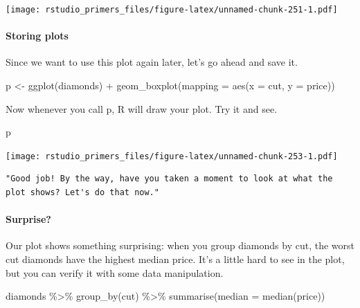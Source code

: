 \documentclass[
]{article}
\newenvironment{Shaded}{\begin{snugshade}}{\end{snugshade}}
\newcommand{\AttributeTok}[1]{\textcolor[rgb]{0.77,0.63,0.00}{#1}}
\newcommand{\FunctionTok}[1]{\textcolor[rgb]{0.00,0.00,0.00}{#1}}
\newcommand{\NormalTok}[1]{#1}
\newcommand{\OtherTok}[1]{\textcolor[rgb]{0.56,0.35,0.01}{#1}}
\newcommand{\SpecialCharTok}[1]{\textcolor[rgb]{0.00,0.00,0.00}{#1}}
\begin{document}
\texttt{[image: rstudio\_primers\_files/figure-latex/unnamed-chunk-251-1.pdf]}

\hypertarget{storing-plots}{%
\paragraph{Storing plots}\label{storing-plots}}

Since we want to use this plot again later, let's go ahead and save it.

\begin{Shaded}
\begin{Highlighting}[]
\NormalTok{p }\OtherTok{\textless{}{-}} \FunctionTok{ggplot}\NormalTok{(diamonds) }\SpecialCharTok{+}
  \FunctionTok{geom\_boxplot}\NormalTok{(}\AttributeTok{mapping =} \FunctionTok{aes}\NormalTok{(}\AttributeTok{x =}\NormalTok{ cut, }\AttributeTok{y =}\NormalTok{ price))}
\end{Highlighting}
\end{Shaded}

Now whenever you call p, R will draw your plot. Try it and see.

\begin{Shaded}
\begin{Highlighting}[]
\NormalTok{p}
\end{Highlighting}
\end{Shaded}

\texttt{[image: rstudio\_primers\_files/figure-latex/unnamed-chunk-253-1.pdf]}

\begin{verbatim}
"Good job! By the way, have you taken a moment to look at what the plot shows? Let's do that now."
\end{verbatim}

\hypertarget{surprise}{%
\paragraph{Surprise?}\label{surprise}}

Our plot shows something surprising: when you group diamonds by cut, the
worst cut diamonds have the highest median price. It's a little hard to
see in the plot, but you can verify it with some data manipulation.

\begin{Shaded}
\begin{Highlighting}[]
\NormalTok{diamonds }\SpecialCharTok{\%\textgreater{}\%} 
  \FunctionTok{group\_by}\NormalTok{(cut) }\SpecialCharTok{\%\textgreater{}\%} 
  \FunctionTok{summarise}\NormalTok{(}\AttributeTok{median =} \FunctionTok{median}\NormalTok{(price))}
\end{Highlighting}
\end{Shaded}
\end{document}
